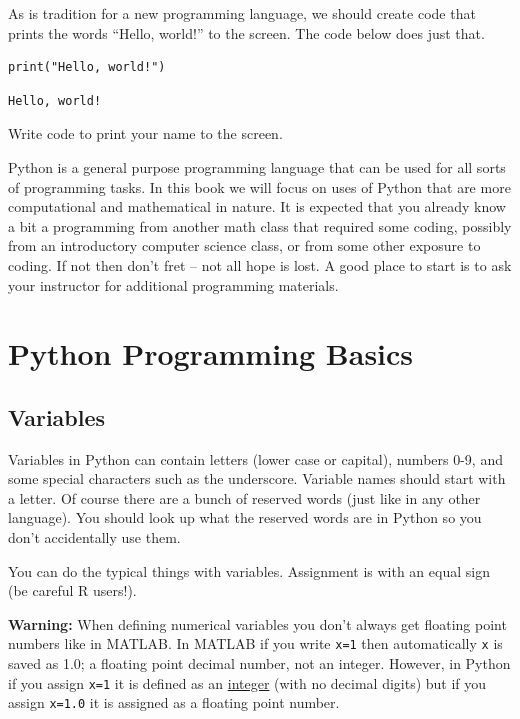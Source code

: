 As is tradition for a new programming language, we should create code that prints the
words ``Hello, world!'' to the screen.  The code below does just that.  

\bcode
\begin{lstlisting}
print("Hello, world!")
\end{lstlisting}
\boutput
\begin{lstlisting}
Hello, world!
\end{lstlisting}


\begin{problem}
    Write code to print your name to the screen.
\end{problem}

Python is a general purpose programming language that can be used for all sorts of
programming tasks.  In this book we will focus on uses of Python that are more
computational and mathematical in nature.  It is expected that you already know a bit a
programming from another math class that required some coding, possibly from an
introductory computer science class, or from some other exposure to coding.  If not then
don't fret -- not all hope is lost.  A good place to start is to ask your instructor for
additional programming materials.  

\section{Python Programming Basics}
\subsection{Variables}
Variables in Python can contain letters (lower case or capital), numbers 0-9, and some
special characters such as the underscore. Variable names should start with a letter. Of
course there are a bunch of reserved words (just like in any other language). You should
look up what the reserved words are in Python so you don't accidentally use them.

You can do the typical things with variables. Assignment is with an equal sign (be careful
R users!).

{\bf Warning:} When defining numerical variables you don't always get floating point
numbers like in MATLAB. In MATLAB if you write \texttt{x=1} then automatically \texttt{x}
is saved as 1.0; a floating point decimal number, not an integer. However, in Python if
you assign \texttt{x=1} it is defined as an \underline{integer} (with no decimal digits)
but if you assign \texttt{x=1.0} it is assigned as a floating point number.

